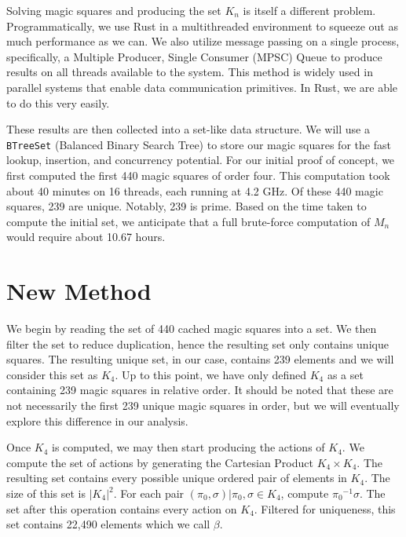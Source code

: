 \documentclass[12pt]{report}
\begin{document}
\par Solving magic squares and producing the set $K_n$ is itself a different problem.
Programmatically, we use Rust in a multithreaded environment to squeeze out as much performance as
we can. We also utilize message passing on a single process, specifically, a Multiple Producer,
Single Consumer (MPSC) Queue to produce results on all threads available to the system. This method
is widely used in parallel systems that enable data communication primitives. In Rust, we are able
to do this very easily.

\par These results are then collected into a set-like data structure. We will use a
\texttt{BTreeSet} (Balanced Binary Search Tree) to store our magic squares for the fast lookup,
insertion, and concurrency potential. For our initial proof of concept, we first computed the first
440 magic squares of order four. This computation took about 40 minutes on 16 threads, each running
at 4.2 GHz. Of these 440 magic squares, 239 are unique. Notably, 239 is prime. Based on the time
taken to compute the initial set, we anticipate that a full brute-force computation of $M_n$ would
require about 10.67 hours.

\section{New Method}
\par We begin by reading the set of 440 cached magic squares into a set. We then filter the set to
reduce duplication, hence the resulting set only contains unique squares. The resulting unique set,
in our case, contains 239 elements and we will consider this set as $K_4$. Up to this point, we
have only defined $K_4$ as a set containing 239 magic squares in relative order. It should be noted
that these are not necessarily the first 239 unique magic squares in order, but we will eventually
explore this difference in our analysis.

\par Once $K_4$ is computed, we may then start producing the actions of $K_4$. We compute the set
of actions by generating the Cartesian Product $K_4 \times K_4$. The resulting set contains every
possible unique ordered pair of elements in $K_4$. The size of this set is $\left|K_4\right|^2$.
For each pair $\left(\pi_0,\sigma\right)\vert \pi_0,\sigma\in K_4$, compute ${\pi_0}^{-1}\sigma$. The set
after
this operation contains every action on $K_4$. Filtered for uniqueness, this set contains 22,490
elements which we call $\beta$.
\end{document}
